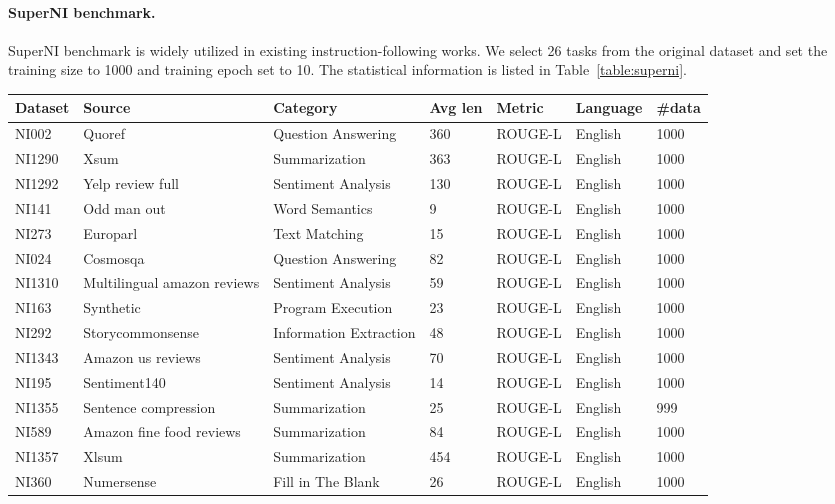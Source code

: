 \paragraph{SuperNI benchmark.}
SuperNI benchmark is widely utilized in existing instruction-following works. We select 26 tasks from the original dataset and set the training size to 1000 and training epoch set to 10. The statistical information is listed in Table~\ref{table:superni}.

\begin{table*}[]
\vspace{-0.8em}
\begin{center}
\begin{scriptsize}
\begin{tabular}{l|llllll}
\toprule Dataset & Source & Category & Avg len & Metric & Language & \#data \\ \midrule \midrule
NI002 & Quoref & Question Answering & 360 & ROUGE-L & English & 1000 \\
NI1290 & Xsum & Summarization & 363 & ROUGE-L & English & 1000 \\
NI1292 & Yelp review full & Sentiment Analysis & 130 & ROUGE-L & English & 1000 \\
NI141 & Odd man out & Word Semantics & 9 & ROUGE-L & English & 1000 \\
NI273 & Europarl & Text Matching & 15 & ROUGE-L & English & 1000 \\
NI024 & Cosmosqa & Question Answering & 82 & ROUGE-L & English & 1000 \\
NI1310 & Multilingual amazon reviews & Sentiment Analysis & 59 & ROUGE-L & English & 1000 \\
NI163 & Synthetic & Program Execution & 23 & ROUGE-L & English & 1000 \\
NI292 & Storycommonsense & Information Extraction & 48 & ROUGE-L & English & 1000 \\
NI1343 & Amazon us reviews & Sentiment Analysis & 70 & ROUGE-L & English & 1000 \\
NI195 & Sentiment140 & Sentiment Analysis & 14 & ROUGE-L & English & 1000 \\
NI1355 & Sentence compression & Summarization & 25 & ROUGE-L & English & 999\\
NI589 & Amazon fine food reviews & Summarization & 84 & ROUGE-L & English & 1000 \\
NI1357 & Xlsum & Summarization & 454 & ROUGE-L & English & 1000 \\
NI360 & Numersense & Fill in The Blank & 26 & ROUGE-L & English & 1000 \\

\end{tabular}
\end{scriptsize}
\end{center}
\end{table*}
